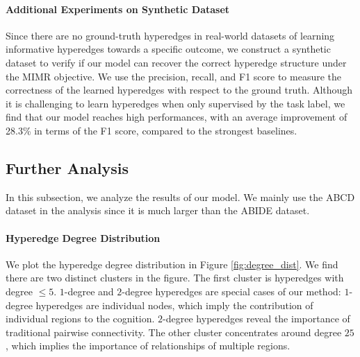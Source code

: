 \paragraph{Additional Experiments on Synthetic Dataset}
Since there are no ground-truth hyperedges in real-world datasets of learning informative hyperedges towards a specific outcome, we construct a synthetic dataset to verify if our model can recover the correct hyperedge structure under the MIMR objective. We use the precision, recall, and F1 score to measure the correctness of the learned hyperedges with respect to the ground truth. Although it is challenging to learn hyperedges when only supervised by the task label, we find that our model reaches high performances, with an average improvement of 28.3\% in terms of the F1 score, compared to the strongest baselines.


\subsection{Further Analysis}
In this subsection, we analyze the results of our model. We mainly use the ABCD dataset in the analysis since it is much larger than the ABIDE dataset.
\paragraph{Hyperedge Degree Distribution}
We plot the hyperedge degree distribution in Figure \ref{fig:degree_dist}. We find there are two distinct clusters in the figure. The first cluster is hyperedges with degree $\leq 5$. $1$-degree and $2$-degree hyperedges are special cases of our method: $1$-degree hyperedges are individual nodes, which imply the contribution of individual regions to the cognition. $2$-degree hyperedges reveal the importance of traditional pairwise connectivity. The other cluster concentrates around degree $25$, which implies the importance of relationships of multiple regions.

